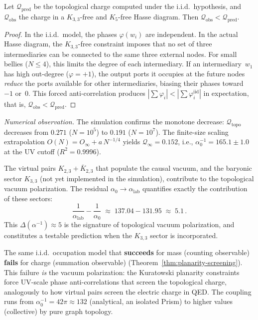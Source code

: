 \begin{theorem}
\label{thm:planarity-screening}
Let $\mathcal{Q}_{\mathrm{pred}}$ be the topological charge computed under
the i.i.d.\ hypothesis, and $\mathcal{Q}_{\mathrm{obs}}$ the charge in a
$K_{3,3}$-free and $K_5$-free Hasse diagram. Then
$\mathcal{Q}_{\mathrm{obs}} < \mathcal{Q}_{\mathrm{pred}}$.
\end{theorem}

\begin{proof}
In the i.i.d.\ model, the phases $\varphi(w_i)$ are independent.
In the actual Hasse diagram, the $K_{3,3}$-free constraint imposes
that no set of three intermediaries can be connected
to the same three external nodes. For small bellies ($N \leq 4$),
this limits the degree of each intermediary. If an intermediary~$w_1$
has high out-degree ($\varphi = +1$), the output ports
it occupies at the future nodes \emph{reduce} the ports available
for other intermediaries, biasing their phases toward~$-1$ or~$0$.
This forced anti-correlation produces $|\sum \varphi_i| <
|\sum \varphi_i^{\mathrm{iid}}|$ in expectation, that is,
$\mathcal{Q}_{\mathrm{obs}} < \mathcal{Q}_{\mathrm{pred}}$.
\end{proof}

\noindent\textit{Numerical observation.}\enspace
The simulation confirms the monotone decrease:
$\mathcal{Q}_{\mathrm{topo}}$ decreases from $0{.}271$ ($N = 10^5$)
to $0{.}191$ ($N = 10^7$). The finite-size scaling extrapolation
$O(N) = O_\infty + a\,N^{-1/4}$ yields
$\mathcal{Q}_\infty = 0{.}152$, i.e.,
$\alpha_0^{-1} = 165{.}1 \pm 1{.}0$ at the UV cutoff
($R^2 = 0{.}9996$).

The virtual pairs $K_{2,3} + \bar{K}_{2,3}$ that populate the
causal vacuum, and the baryonic sector $K_{3,3}$ (not yet implemented in
the simulation), contribute to the topological vacuum
polarization. The residual $\alpha_0 \to \alpha_{\text{lab}}$ quantifies
exactly the contribution of these sectors:
\[
  \frac{1}{\alpha_{\text{lab}}} - \frac{1}{\alpha_0}
  \;\approx\; 137{.}04 - 131{.}95
  \;\approx\; 5{.}1\,.
\]
This $\Delta(\alpha^{-1}) \approx 5$ is the signature of topological
vacuum polarization, and constitutes a testable prediction
when the $K_{3,3}$ sector is incorporated.

\begin{result}[title={Vacuum polarization is a consequence of planarity}]
\label{res:vacuum-polarization}
The same i.i.d.\ occupation model that \textbf{succeeds} for
mass (counting observable) \textbf{fails} for charge
(summation observable) (Theorem~\ref{thm:planarity-screening}). This
failure \emph{is} the vacuum polarization: the Kuratowski planarity
constraints force UV-scale phase anti-correlations that screen the
topological charge, analogously to how virtual pairs screen the
electric charge in QED. The coupling
runs from $\alpha_0^{-1} = 42\pi \approx 132$ (analytical, an
isolated Prism) to higher values (collective) by pure
graph topology.
\end{result}

